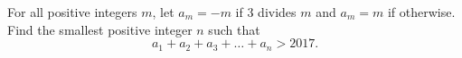 For all positive integers $m$, let $a_m=-m$ if $3$ divides $m$ and $a_m=m$ if otherwise. Find the smallest positive integer $n$ such that \[a_1+a_2+a_3+\ldots+a_n>2017.\]